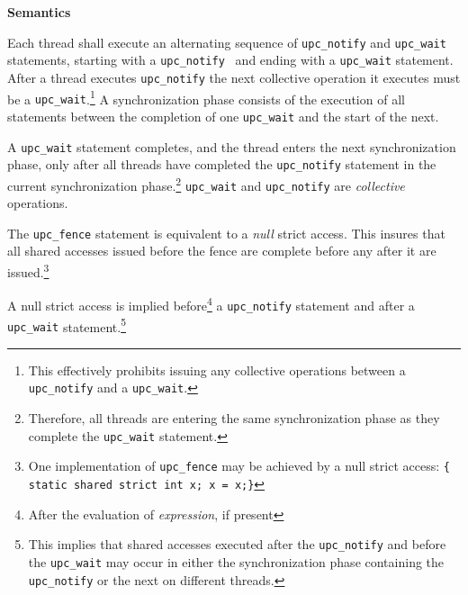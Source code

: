 {\bf Semantics} 


\np Each thread shall execute an alternating sequence of
     {\tt upc\_notify} and {\tt upc\_wait} statements, starting with a
     {\tt upc\_notify } and ending with a {\tt upc\_wait} statement.   After a
     thread executes {\tt upc\_notify} the next collective operation it executes
     must be a {\tt upc\_wait}.\footnote{This effectively prohibits issuing any
     collective operations between a {\tt upc\_notify} and  a {\tt upc\_wait}.}
     A synchronization phase consists of the execution of all statements
     between the completion of one {\tt upc\_wait} and the start of
     the next.

\np A {\tt upc\_wait} statement completes, and the
     thread enters the next synchronization phase, only after all
     threads have completed the {\tt upc\_notify} statement in the
     current synchronization phase.\footnote{Therefore,
     all threads are entering the same synchronization phase as they
     complete the {\tt upc\_wait} statement.}  {\tt upc\_wait}
     and {\tt upc\_notify} are {\em collective} operations.

\np The {\tt upc\_fence} statement is equivalent to a {\em
    null} strict access.  This insures that all shared accesses
    issued before the fence are complete before any after it are
    issued.\footnote{One implementation of {\tt upc\_fence} 
    may be achieved by a null strict access:
     {\tt  \{ static shared strict int x; x = x;\}}} 

\np A null strict access is implied before\footnote{After the evaluation 
    of {\em expression}, if present} a {\tt upc\_notify} statement and 
    after a {\tt upc\_wait} 
    statement.\footnote{This implies that shared accesses executed 
    after the {\tt upc\_notify} and before the {\tt upc\_wait} may occur in 
    either the synchronization phase containing the {\tt upc\_notify} or 
    the next on different threads.}

